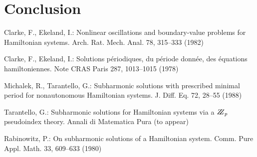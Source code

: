 \documentclass{llncs}
\begin{document}
\section{Conclusion}
%
%
\begin{thebibliography}{5}
%
Clarke, F., Ekeland, I.:
Nonlinear oscillations and
boundary-value problems for Hamiltonian systems.
Arch. Rat. Mech. Anal. 78, 315--333 (1982)

Clarke, F., Ekeland, I.:
Solutions p\'{e}riodiques, du
p\'{e}riode donn\'{e}e, des \'{e}quations hamiltoniennes.
Note CRAS Paris 287, 1013--1015 (1978)

Michalek, R., Tarantello, G.:
Subharmonic solutions with prescribed minimal
period for nonautonomous Hamiltonian systems.
J. Diff. Eq. 72, 28--55 (1988)

Tarantello, G.:
Subharmonic solutions for Hamiltonian
systems via a $\bbbz_{p}$ pseudoindex theory.
Annali di Matematica Pura (to appear)

Rabinowitz, P.:
On subharmonic solutions of a Hamiltonian system.
Comm. Pure Appl. Math. 33, 609--633 (1980)

\end{thebibliography}
\clearpage
{} %
\renewcommand{\indexname}{Author Index}
\printindex
\clearpage
\end{document}
